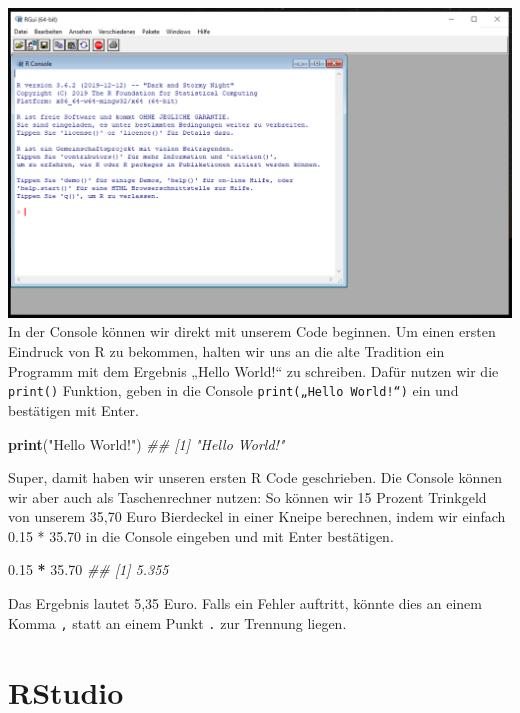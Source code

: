 \documentclass[
]{book}
\newenvironment{Shaded}{\begin{snugshade}}{\end{snugshade}}
\newcommand{\CommentTok}[1]{\textcolor[rgb]{0.56,0.35,0.01}{\textit{#1}}}
\newcommand{\FloatTok}[1]{\textcolor[rgb]{0.00,0.00,0.81}{#1}}
\newcommand{\KeywordTok}[1]{\textcolor[rgb]{0.13,0.29,0.53}{\textbf{#1}}}
\newcommand{\NormalTok}[1]{#1}
\newcommand{\OperatorTok}[1]{\textcolor[rgb]{0.81,0.36,0.00}{\textbf{#1}}}
\newcommand{\StringTok}[1]{\textcolor[rgb]{0.31,0.60,0.02}{#1}}
\begin{document}
\includegraphics[width=21.25in]{img/s_r-console}
In der Console können wir direkt mit unserem Code beginnen. Um einen ersten Eindruck von R zu bekommen, halten wir uns an die alte Tradition ein Programm mit dem Ergebnis „Hello World!{}`` zu schreiben. Dafür nutzen wir die \texttt{print()} Funktion, geben in die Console \texttt{print(„Hello\ World!“)} ein und bestätigen mit Enter.

\begin{Shaded}
\begin{Highlighting}[]
\KeywordTok{print}\NormalTok{(}\StringTok{"Hello World!"}\NormalTok{)}
\CommentTok{## [1] "Hello World!"}
\end{Highlighting}
\end{Shaded}

Super, damit haben wir unseren ersten R Code geschrieben.
Die Console können wir aber auch als Taschenrechner nutzen: So können wir 15 Prozent Trinkgeld von unserem 35,70 Euro Bierdeckel in einer Kneipe berechnen, indem wir einfach 0.15 * 35.70 in die Console eingeben und mit Enter bestätigen.

\begin{Shaded}
\begin{Highlighting}[]
\FloatTok{0.15} \OperatorTok{*}\StringTok{ }\FloatTok{35.70}
\CommentTok{## [1] 5.355}
\end{Highlighting}
\end{Shaded}

Das Ergebnis lautet 5,35 Euro. Falls ein Fehler auftritt, könnte dies an einem Komma \texttt{,} statt an einem Punkt \texttt{.} zur Trennung liegen.

\hypertarget{rstudio}{%
\section{RStudio}\label{rstudio}}

  
\end{document}
